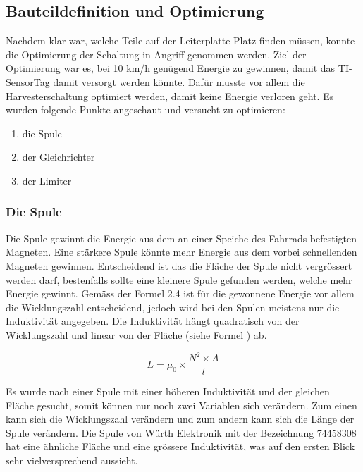 \subsection{Bauteildefinition und Optimierung}

Nachdem klar war, welche Teile auf der Leiterplatte Platz finden müssen, konnte die Optimierung der Schaltung in Angriff genommen werden. Ziel der Optimierung war es, bei 10 km/h genügend Energie zu gewinnen, damit das TI-SensorTag damit versorgt werden könnte. Dafür musste vor allem die Harvesterschaltung optimiert werden, damit keine Energie verloren geht. 
Es wurden folgende Punkte angeschaut und versucht zu optimieren:

\begin{enumerate}
    \item die Spule
    \item der Gleichrichter
    \item der Limiter
\end{enumerate}

\subsubsection{Die Spule}

Die Spule gewinnt die Energie aus dem an einer Speiche des Fahrrads befestigten Magneten. Eine stärkere Spule könnte mehr Energie aus dem vorbei schnellenden Magneten gewinnen. Entscheidend ist das die Fläche der Spule nicht vergrössert werden darf, bestenfalls sollte eine kleinere Spule gefunden werden, welche mehr Energie gewinnt. Gemäss der Formel 2.4 ist für die gewonnene Energie vor allem die Wicklungszahl entscheidend, jedoch wird bei den Spulen meistens nur die Induktivität angegeben. Die Induktivität hängt quadratisch von der Wicklungszahl und linear von der Fläche (siehe Formel \cite{equ_inductivity}) ab.

\begin{equation}
	L = \mu_0 \times \frac{N^2\times A}{l}
\end{equation}

Es wurde nach einer Spule mit einer höheren Induktivität und der gleichen Fläche gesucht, somit können nur noch zwei Variablen sich verändern. Zum einen kann sich die Wicklungszahl verändern und zum andern kann sich die Länge der Spule verändern. Die Spule von Würth Elektronik mit der Bezeichnung 74458308 hat eine ähnliche Fläche und eine grössere Induktivität, was auf den ersten Blick sehr vielversprechend aussieht.

